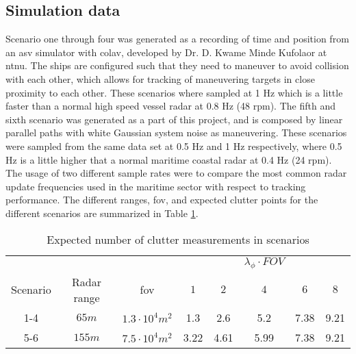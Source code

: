 \subsection{Simulation data}
Scenario one through four was generated as a recording of time and position from an \gls{asv} simulator with \gls{colav}, developed by Dr. D. Kwame Minde  Kufolaor at \gls{ntnu}. The ships are configured such that they need to maneuver to avoid collision with each other, which allows for tracking of maneuvering targets in close proximity to each other. These scenarios where sampled at 1 Hz which is a little faster than a normal high speed vessel \gls{radar} at 0.8 Hz (48 \gls{rpm}). The fifth and sixth scenario was generated as a part of this project, and is composed by linear parallel paths with white Gaussian system noise as maneuvering. These scenarios were sampled from the same data set at 0.5 Hz  and 1 Hz respectively, where 0.5 Hz is a little higher that a normal maritime coastal \gls{radar} at 0.4 Hz (24 \gls{rpm}). The usage of two different sample rates were to compare the most common \gls{radar} update frequencies used in the maritime sector with respect to tracking performance. The different ranges, \gls{fov}, and expected clutter points for the different scenarios are summarized in Table \ref{tab:clutter_measurements}.

\begin{table}
\centering
\begin{tabular}{c c c c c c c c}
			&				&						& & &$\lambda_\phi \cdot FOV$& 	&		\\
Scenario 	& Radar range	& \gls{fov}				& $1$ 	& $2$ 	& $4$ 	&$6$ 	& $8$	\\ \hline
1-4		 	& $65 m$ 		& $1.3\cdot10^4 m^2$	& 1.3 	& 2.6 	& 5.2 	& 7.38 	& 9.21 	\\
5-6		 	& $155 m$		& $7.5\cdot10^4 m^2$	& 3.22 	& 4.61 	& 5.99 	& 7.38 	& 9.21 					
\end{tabular}
\caption{Expected number of clutter measurements in scenarios}
\label{tab:clutter_measurements}
\end{table}

